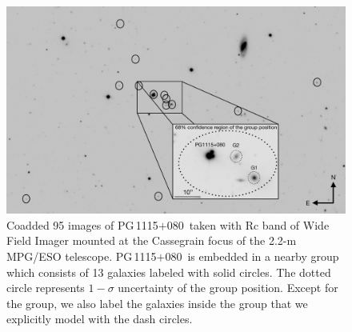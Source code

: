 \documentclass[useAMS,usenatbib]{mnras}
\newcommand\pg{PG\,1115$+$080}
\begin{document}
\begin{figure}
\centering
\includegraphics[scale=0.55]{PG1115_envi8.png}
\caption{Coadded 95 images of \pg~taken with Rc band of Wide Field Imager mounted at the Cassegrain focus of the 2.2-m MPG/ESO telescope. 
\pg~is embedded in a nearby group which consists of 13 galaxies labeled with solid circles. The dotted circle represents $1-\sigma$ uncertainty of the group position. Except for the group, we also label the galaxies inside the group that we explicitly model with the dash circles.}
\label{fig:PG1115_envir}
\end{figure}
\end{document}
